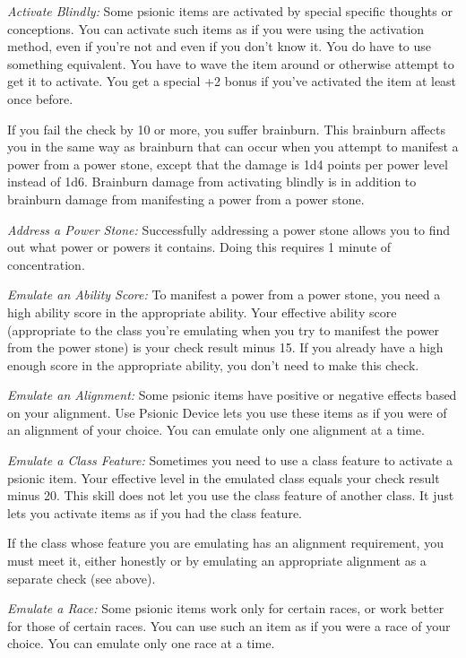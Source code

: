 \documentclass{article}
\begin{document}
\vspace{12pt}
\textit{Activate Blindly: }Some psionic items are activated by special specific 
thoughts or conceptions. You can activate such items as if you were using the activation 
method, even if you're not and even if you don't know it. You do have to use something 
equivalent. You have to wave the item around or otherwise attempt to get it to 
activate. You get a special +2 bonus if you've activated the item at least once 
before.

If you fail the check by 10 or more, you suffer brainburn. This brainburn affects 
you in the same way as brainburn that can occur when you attempt to manifest a 
power from a power stone, except that the damage is 1d4 points per power level 
instead of 1d6. Brainburn damage from activating blindly is in addition to brainburn 
damage from manifesting a power from a power stone.

\textit{Address a Power Stone: }Successfully addressing a power stone allows you 
to find out what power or powers it contains. Doing this requires 1 minute of concentration.

\textit{Emulate an Ability Score: }To manifest a power from a power stone, you 
need a high ability score in the appropriate ability. Your effective ability score 
(appropriate to the class you're emulating when you try to manifest the power from 
the power stone) is your check result minus 15. If you already have a high enough 
score in the appropriate ability, you don't need to make this check.

\textit{Emulate an Alignment: }Some psionic items have positive or negative effects 
based on your alignment. Use Psionic Device lets you use these items as if you 
were of an alignment of your choice. You can emulate only one alignment at a time. 

\textit{Emulate a Class Feature: }Sometimes you need to use a class feature to 
activate a psionic item. Your effective level in the emulated class equals your 
check result minus 20. This skill does not let you use the class feature of another 
class. It just lets you activate items as if you had the class feature.

If the class whose feature you are emulating has an alignment requirement, you 
must meet it, either honestly or by emulating an appropriate alignment as a separate 
check (see above).

\textit{Emulate a Race: }Some psionic items work only for certain races, or work 
better for those of certain races. You can use such an item as if you were a race 
of your choice. You can emulate only one race at a time.
\end{document}
